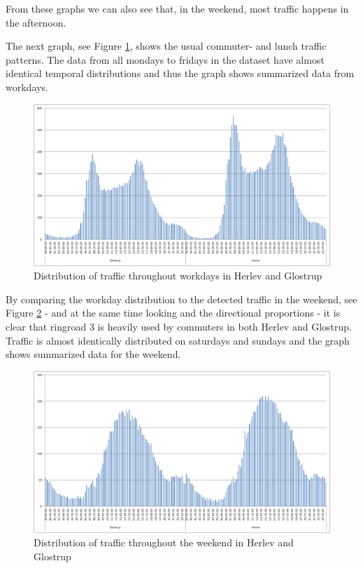 From these graphs we can also see that, in the weekend, most traffic happens in the afternoon.

The next graph, see Figure \ref{fig:commuter}, shows the usual commuter- and lunch traffic patterns. The data from all mondays to fridays in the dataset have almost identical temporal distributions and thus the graph shows summarized data from workdays.

\begin{figure}[ht]
\centering
\includegraphics[scale=0.25]{distribution_workday.png} 
\caption{Distribution of traffic throughout workdays in Herlev and Glostrup}
\label{fig:commuter}
\end{figure}

By comparing the workday distribution to the detected traffic in the weekend, see Figure \ref{fig:weekends} - and at the same time looking and the directional proportions - it is clear that ringroad 3 is heavily used by commuters in both Herlev and Glostrup. Traffic is almost identically distributed on saturdays and sundays and the graph shows summarized data for the weekend.

\begin{figure}[ht]
\centering
\includegraphics[scale=0.25]{distribution_weekend.png} 
\caption{Distribution of traffic throughout the weekend in Herlev and Glostrup}
\label{fig:weekends}
\end{figure}

